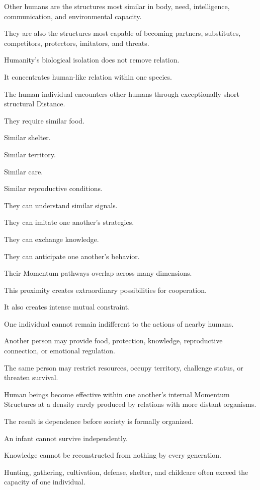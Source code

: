 Other humans are the structures most similar in body, need, intelligence, communication, and environmental capacity.

They are also the structures most capable of becoming partners, substitutes, competitors, protectors, imitators, and threats.

Humanity’s biological isolation does not remove relation.

It concentrates human-like relation within one species.

The human individual encounters other humans through exceptionally short structural Distance.

They require similar food.

Similar shelter.

Similar territory.

Similar care.

Similar reproductive conditions.

They can understand similar signals.

They can imitate one another’s strategies.

They can exchange knowledge.

They can anticipate one another’s behavior.

Their Momentum pathways overlap across many dimensions.

This proximity creates extraordinary possibilities for cooperation.

It also creates intense mutual constraint.

One individual cannot remain indifferent to the actions of nearby humans.

Another person may provide food, protection, knowledge, reproductive connection, or emotional regulation.

The same person may restrict resources, occupy territory, challenge status, or threaten survival.

Human beings become effective within one another’s internal Momentum Structures at a density rarely produced by relations with more distant organisms.

The result is dependence before society is formally organized.

An infant cannot survive independently.

Knowledge cannot be reconstructed from nothing by every generation.

Hunting, gathering, cultivation, defense, shelter, and childcare often exceed the capacity of one individual.

